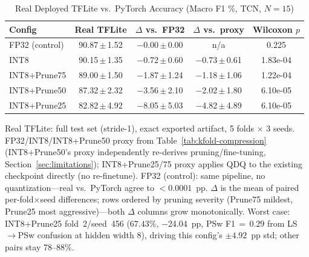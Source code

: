 \begin{table}[!t]
  \centering
  \caption{Real Deployed TFLite vs.\ PyTorch Accuracy (Macro F1 \%, TCN, $N{=}15$)}
  \label{tab:int8-real}
  \scriptsize
  \setlength{\tabcolsep}{3.5pt}
  \renewcommand{\arraystretch}{1.08}
  \begin{tabular}{@{} l c c c c @{}}
    \toprule
    \textbf{Config} & \textbf{Real TFLite} & \textbf{$\Delta$ vs.\ FP32} & \textbf{$\Delta$ vs.\ proxy} & \textbf{Wilcoxon $p$} \\
    \midrule
    FP32 (control) & 90.87\,$\pm$\,1.52 & $-$0.00\,$\pm$\,0.00 & n/a & 0.225 \\
    INT8 & 90.15\,$\pm$\,1.35 & $-$0.72\,$\pm$\,0.60 & $-$0.73\,$\pm$\,0.61 & 1.83e-04 \\
    INT8+Prune75 & 89.00\,$\pm$\,1.50 & $-$1.87\,$\pm$\,1.24 & $-$1.18\,$\pm$\,1.06 & 1.22e-04 \\
    INT8+Prune50 & 87.32\,$\pm$\,2.32 & $-$3.56\,$\pm$\,2.10 & $-$2.02\,$\pm$\,1.80 & 6.10e-05 \\
    INT8+Prune25 & 82.82\,$\pm$\,4.92 & $-$8.05\,$\pm$\,5.03 & $-$4.82\,$\pm$\,4.89 & 6.10e-05 \\
    \bottomrule
  \end{tabular}

  \vspace{0.3em}
  {\scriptsize Real TFLite: full test set (stride-1), exact exported artifact, 5 folds $\times$ 3
  seeds. FP32/INT8/INT8+Prune50 proxy from Table~\ref{tab:kfold-compression} (INT8+Prune50's proxy
  independently re-derives pruning/fine-tuning, Section~\ref{sec:limitations}); INT8+Prune25/75
  proxy applies QDQ to the existing checkpoint directly (no re-finetune). FP32 (control): same
  pipeline, no quantization---real vs.\ PyTorch agree to $<0.0001$~pp. $\Delta$ is the mean of
  paired per-fold$\times$seed differences; rows ordered by pruning severity (Prune75 mildest,
  Prune25 most aggressive)---both $\Delta$ columns grow monotonically. Worst case: INT8+Prune25
  fold~2/seed~456 ($67.43\%$, $-$24.04~pp, PSw F1$\,{=}\,0.29$ from LS$\to$PSw confusion at hidden
  width 8), driving this config's $\pm4.92$~pp std; other pairs stay 78--88\%.}
\end{table}
